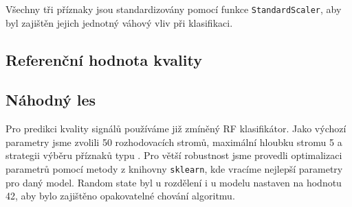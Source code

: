Všechny tři příznaky jsou standardizovány pomocí funkce \texttt{StandardScaler}, aby byl zajištěn jejich jednotný váhový vliv při klasifikaci.

\subsection*{Referenční hodnota kvality}







\subsection*{Náhodný les}
Pro predikci kvality signálů používáme již zmíněný \acs{RF} klasifikátor.
Jako výchozí parametry jsme zvolili 50 rozhodovacích stromů, maximální hloubku stromu 5 a strategii výběru příznaků typu .
Pro větší robustnost jsme provedli optimalizaci parametrů pomocí metody  z knihovny \texttt{sklearn}, kde vracíme nejlepší parametry pro daný model.
Random state byl u rozdělení i u modelu nastaven na hodnotu 42, aby bylo zajištěno opakovatelné chování algoritmu. %


